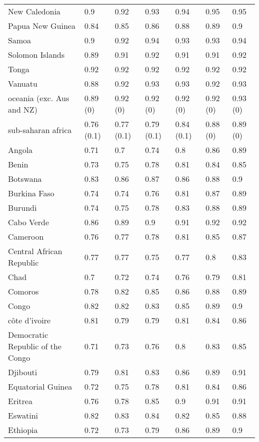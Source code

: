 \begin{longtable}[t]{lllllll}
New Caledonia & 0.9 & 0.92 & 0.93 & 0.94 & 0.95 & 0.95\\
Papua New Guinea & 0.84 & 0.85 & 0.86 & 0.88 & 0.89 & 0.9\\
Samoa & 0.9 & 0.92 & 0.94 & 0.93 & 0.93 & 0.94\\
Solomon Islands & 0.89 & 0.91 & 0.92 & 0.91 & 0.91 & 0.92\\
\addlinespace
Tonga & 0.92 & 0.92 & 0.92 & 0.92 & 0.92 & 0.92\\
Vanuatu & 0.88 & 0.92 & 0.93 & 0.93 & 0.92 & 0.93\\
oceania (exc. Aus and NZ) & 0.89 (0) & 0.92 (0) & 0.92 (0) & 0.92 (0) & 0.92 (0) & 0.93 (0)\\
sub-saharan africa & 0.76 (0.1) & 0.77 (0.1) & 0.79 (0.1) & 0.84 (0.1) & 0.88 (0) & 0.89 (0)\\
Angola & 0.71 & 0.7 & 0.74 & 0.8 & 0.86 & 0.89\\
\addlinespace
Benin & 0.73 & 0.75 & 0.78 & 0.81 & 0.84 & 0.85\\
Botswana & 0.83 & 0.86 & 0.87 & 0.86 & 0.88 & 0.9\\
Burkina Faso & 0.74 & 0.74 & 0.76 & 0.81 & 0.87 & 0.89\\
Burundi & 0.74 & 0.75 & 0.78 & 0.83 & 0.88 & 0.89\\
Cabo Verde & 0.86 & 0.89 & 0.9 & 0.91 & 0.92 & 0.92\\
\addlinespace
Cameroon & 0.76 & 0.77 & 0.78 & 0.81 & 0.85 & 0.87\\
Central African Republic & 0.77 & 0.77 & 0.75 & 0.77 & 0.8 & 0.83\\
Chad & 0.7 & 0.72 & 0.74 & 0.76 & 0.79 & 0.81\\
Comoros & 0.78 & 0.82 & 0.85 & 0.86 & 0.88 & 0.89\\
Congo & 0.82 & 0.82 & 0.83 & 0.85 & 0.89 & 0.9\\
\addlinespace
côte d'ivoire & 0.81 & 0.79 & 0.79 & 0.81 & 0.84 & 0.86\\
Democratic Republic of the Congo & 0.71 & 0.73 & 0.76 & 0.8 & 0.83 & 0.85\\
Djibouti & 0.79 & 0.81 & 0.83 & 0.86 & 0.89 & 0.91\\
Equatorial Guinea & 0.72 & 0.75 & 0.78 & 0.81 & 0.84 & 0.86\\
Eritrea & 0.76 & 0.78 & 0.85 & 0.9 & 0.91 & 0.91\\
\addlinespace
Eswatini & 0.82 & 0.83 & 0.84 & 0.82 & 0.85 & 0.88\\
Ethiopia & 0.72 & 0.73 & 0.79 & 0.86 & 0.89 & 0.9\\

\end{longtable}
